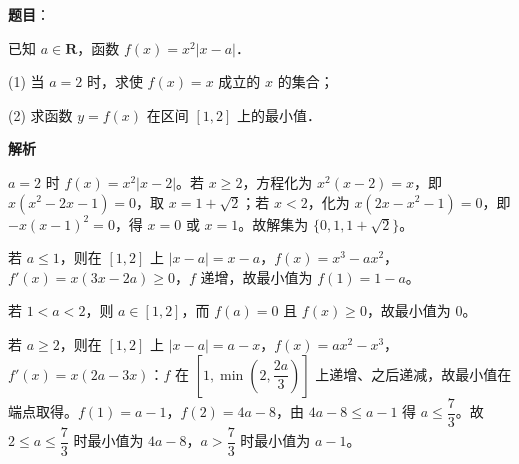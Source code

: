 \begin{answer}

\textbf{题目}：

已知 $a \in \mathbf{R}$，函数 $f(x) = x^2|x - a|$．

(1) 当 $a = 2$ 时，求使 $f(x) = x$ 成立的 $x$ 的集合；

(2) 求函数 $y = f(x)$ 在区间 $[1, 2]$ 上的最小值．

\textbf{解析}


$a = 2$ 时 $f(x) = x^2|x - 2|$。若 $x \geqslant 2$，方程化为 $x^2(x-2) = x$，即 $x\left(x^2 - 2x - 1\right) = 0$，取 $x = 1 + \sqrt{2}$；若 $x < 2$，化为 $x\left(2x - x^2 - 1\right) = 0$，即 $-x(x-1)^2 = 0$，得 $x = 0$ 或 $x = 1$。故解集为 $\{0, 1, 1+\sqrt{2}\}$。


若 $a \leqslant 1$，则在 $[1, 2]$ 上 $|x - a| = x - a$，$f(x) = x^3 - ax^2$，$f'(x) = x(3x - 2a) \geqslant 0$，$f$ 递增，故最小值为 $f(1) = 1 - a$。

若 $1 < a < 2$，则 $a \in [1, 2]$，而 $f(a) = 0$ 且 $f(x) \geqslant 0$，故最小值为 $0$。

若 $a \geqslant 2$，则在 $[1, 2]$ 上 $|x - a| = a - x$，$f(x) = ax^2 - x^3$，$f'(x) = x(2a - 3x)$：$f$ 在 $\left[1, \min\left(2, \dfrac{2a}{3}\right)\right]$ 上递增、之后递减，故最小值在端点取得。$f(1) = a - 1$，$f(2) = 4a - 8$，由 $4a - 8 \leqslant a - 1$ 得 $a \leqslant \dfrac{7}{3}$。故 $2 \leqslant a \leqslant \dfrac{7}{3}$ 时最小值为 $4a - 8$，$a > \dfrac{7}{3}$ 时最小值为 $a - 1$。



\end{answer}
